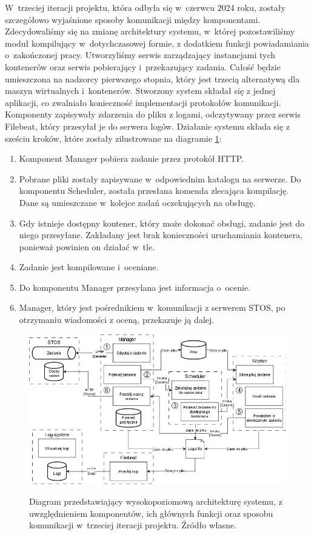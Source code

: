 W~trzeciej iteracji projektu, która odbyła się w~czerwcu 2024 roku, zostały szczegółowo wyjaśnione sposoby komunikacji między komponentami. Zdecydowaliśmy się na zmianę architektury systemu, w~której pozostawiliśmy moduł kompilujący w~dotychczasowej formie, z dodatkiem funkcji powiadamiania o~zakończonej pracy. Utworzyliśmy serwis zarządzający instancjami tych kontenerów oraz serwis pobierający i~przekazujący zadania. Całość będzie umieszczona na nadzorcy pierwszego stopnia, który jest trzecią alternatywą dla maszyn wirtualnych i~kontenerów. Stworzony system składał się z jednej aplikacji, co zwalniało konieczność implementacji protokołów komunikacji. Komponenty zapisywały zdarzenia do pliku z logami, odczytywany przez serwis Filebeat, który przesyłał je do serwera logów. Działanie systemu składa się z sześciu kroków, które zostały zilustrowane na diagramie \ref{i3}:
\begin{enumerate}
	\item Komponent Manager pobiera zadanie przez protokół HTTP.
	\item Pobrane pliki zostały zapisywane w~odpowiednim katalogu na serwerze. Do komponentu Scheduler, została przesłana komenda zlecająca kompilację. Dane są umieszczane w~kolejce zadań oczekujących na obsługę.
	\item Gdy istnieje dostępny kontener, który może dokonać obsługi, zadanie jest do niego przesyłane. Zakładany jest brak konieczności uruchamiania kontenera, ponieważ powinien on działać w~tle.
	\item Zadanie jest kompilowane i~oceniane.
	\item Do komponentu Manager przesyłana jest informacja o~ocenie.
	\item Manager, który jest pośrednikiem w~komunikacji z serwerem STOS, po otrzymaniu wiadomości z oceną, przekazuje ją dalej.
\end{enumerate}
\begin{figure}[!h]
	\begin{center}
		\resizebox{1.0\textwidth}{!} {
			\includegraphics{img/1/i3_arch.png}
		}
		\caption[Architektura po trzeciej iteracji]{Diagram przedstawiający wysokopoziomową architekturę systemu, z uwzględnieniem komponentów, ich głównych funkcji oraz sposobu komunikacji w~trzeciej iteracji projektu. Źródło własne.}
		\label{i3}
	\end{center}
\end{figure}


